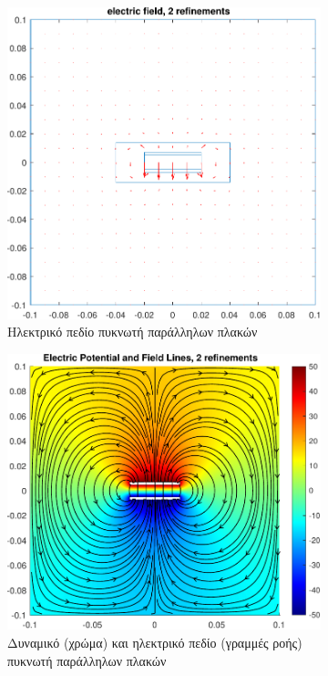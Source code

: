 \documentclass[10pt, letterpaper]{article}
\begin{document}
\begin{figure}[h!]
  \centering
  \begin{subfigure}[b]{0.44\textwidth}
      \centering
      \includegraphics[width=\textwidth]{capacitor_field_2_domain:5.pdf}
      \caption{Ηλεκτρικό πεδίο πυκνωτή παράλληλων πλακών \vspace{\baselineskip}}
      \label{}
  \end{subfigure}
  \hfill
  \begin{subfigure}[b]{0.5\textwidth}
    \centering
    \includegraphics[width=\textwidth]{capacitor_field_streamlines_2_domain:5.pdf}
    \caption{Δυναμικό (χρώμα) και ηλεκτρικό πεδίο (γραμμές ροής) πυκνωτή παράλληλων πλακών}
    \label{}
\end{subfigure}
  \caption{}
  \label{fig:capacitor_field}
\end{figure}
\end{document}
